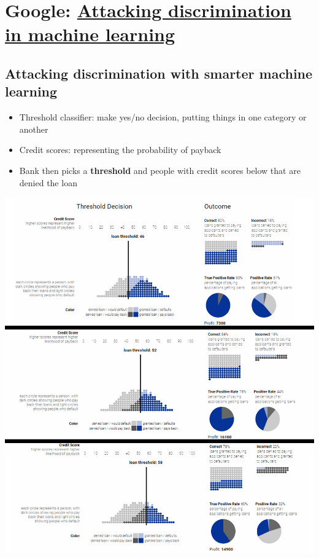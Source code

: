 \documentclass[12pt,a4paper]{article}
\begin{document}
\section{Google: \href{https://research.google.com/bigpicture/attacking-discrimination-in-ml/}{Attacking discrimination in machine learning}}
\subsection{Attacking discrimination with smarter machine learning}
\begin{itemize}
\item Threshold classifier: make yes/no decision, putting things in one category or another
\item Credit scores: representing the probability of payback
\item Bank then picks a \textbf{threshold} and people with credit scores below that are denied the loan
\end{itemize}
\includegraphics[scale=0.4]{resources/1/loanML}
\end{document}
